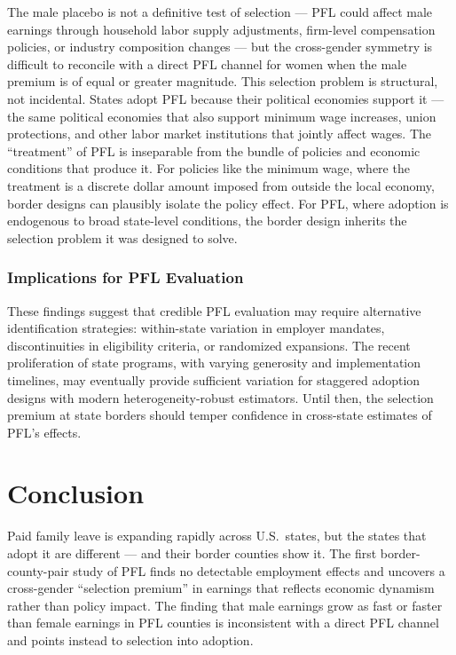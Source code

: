 \documentclass[12pt]{article}
\begin{document}
The male placebo is not a definitive test of selection --- PFL could affect male earnings through household labor supply adjustments, firm-level compensation policies, or industry composition changes --- but the cross-gender symmetry is difficult to reconcile with a direct PFL channel for women when the male premium is of equal or greater magnitude. This selection problem is structural, not incidental. States adopt PFL because their political economies support it --- the same political economies that also support minimum wage increases, union protections, and other labor market institutions that jointly affect wages. The ``treatment'' of PFL is inseparable from the bundle of policies and economic conditions that produce it. For policies like the minimum wage, where the treatment is a discrete dollar amount imposed from outside the local economy, border designs can plausibly isolate the policy effect. For PFL, where adoption is endogenous to broad state-level conditions, the border design inherits the selection problem it was designed to solve.

\subsubsection*{Implications for PFL Evaluation} These findings suggest that credible PFL evaluation may require alternative identification strategies: within-state variation in employer mandates, discontinuities in eligibility criteria, or randomized expansions. The recent proliferation of state programs, with varying generosity and implementation timelines, may eventually provide sufficient variation for staggered adoption designs with modern heterogeneity-robust estimators. Until then, the selection premium at state borders should temper confidence in cross-state estimates of PFL's effects.


\section{Conclusion}

Paid family leave is expanding rapidly across U.S.\ states, but the states that adopt it are different --- and their border counties show it. The first border-county-pair study of PFL finds no detectable employment effects and uncovers a cross-gender ``selection premium'' in earnings that reflects economic dynamism rather than policy impact. The finding that male earnings grow as fast or faster than female earnings in PFL counties is inconsistent with a direct PFL channel and points instead to selection into adoption.
\end{document}
